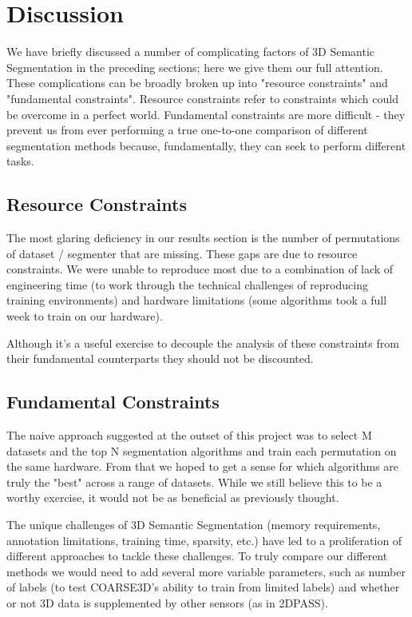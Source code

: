 \section{Discussion}
\label{chap:discussion}

We have briefly discussed a number of complicating factors of 3D Semantic Segmentation in the preceding sections; here we give them our full attention. These complications can be broadly broken up into "resource constraints" and "fundamental constraints". Resource constraints refer to constraints which could be overcome in a perfect world. Fundamental constraints are more difficult - they prevent us from ever performing a true one-to-one comparison of different segmentation methods because, fundamentally, they can seek to perform different tasks.

\subsection{Resource Constraints}
\label{sec:resource-constraints}

The most glaring deficiency in our results section is the number of permutations of dataset / segmenter that are missing. These gaps are due to resource constraints. We were unable to reproduce most due to a combination of lack of engineering time (to work through the technical challenges of reproducing training environments) and hardware limitations (some algorithms took a full week to train on our hardware).

Although it's a useful exercise to decouple the analysis of these constraints from their fundamental counterparts they should not be discounted.

\subsection{Fundamental Constraints}
\label{sec:fundamental-constraints}

The naive approach suggested at the outset of this project was to select M datasets and the top N segmentation algorithms and train each permutation on the same hardware. From that we hoped to get a sense for which algorithms are truly the "best" across a range of datasets. While we still believe this to be a worthy exercise, it would not be as beneficial as previously thought.

The unique challenges of 3D Semantic Segmentation (memory requirements, annotation limitations, training time, sparsity, etc.) have led to a proliferation of different approaches to tackle these challenges. To truly compare our different methods we would need to add several more variable parameters, such as number of labels (to test COARSE3D's ability to train from limited labels) and whether or not 3D data is supplemented by other sensors (as in 2DPASS).

